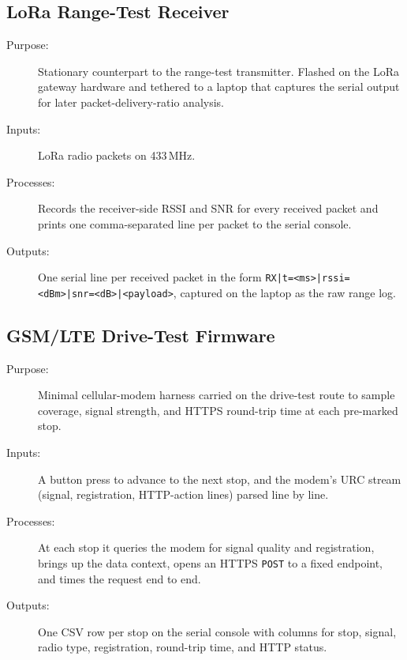 

\subsection{LoRa Range-Test Receiver}
\label{sec:code_lora_rx}

\begin{description}
\item[Purpose:] Stationary counterpart to the range-test transmitter. Flashed on the LoRa gateway hardware and tethered to a laptop that captures the serial output for later packet-delivery-ratio analysis.
\item[Inputs:] LoRa radio packets on 433\,MHz.
\item[Processes:] Records the receiver-side RSSI and SNR for every received packet and prints one comma-separated line per packet to the serial console.
\item[Outputs:] One serial line per received packet in the form \texttt{RX|}\allowbreak\texttt{t=<ms>|}\allowbreak\texttt{rssi=<dBm>|}\allowbreak\texttt{snr=<dB>|}\allowbreak\texttt{<payload>}, captured on the laptop as the raw range log.
\end{description}



\subsection{GSM/LTE Drive-Test Firmware}
\label{sec:code_gsm_drive}

\begin{description}
\item[Purpose:] Minimal cellular-modem harness carried on the drive-test route to sample coverage, signal strength, and HTTPS round-trip time at each pre-marked stop.
\item[Inputs:] A button press to advance to the next stop, and the modem's URC stream (signal, registration, HTTP-action lines) parsed line by line.
\item[Processes:] At each stop it queries the modem for signal quality and registration, brings up the data context, opens an HTTPS \texttt{POST} to a fixed endpoint, and times the request end to end.
\item[Outputs:] One CSV row per stop on the serial console with columns for stop, signal, radio type, registration, round-trip time, and HTTP status.
\end{description}


